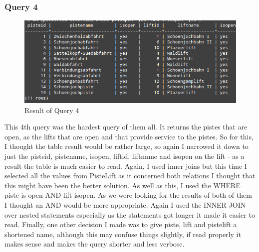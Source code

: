\documentclass[12pt]{article}
\begin{document}
\subsubsection{Query 4}
\begin{figure}[htp]
\centering
\includegraphics[scale=0.55]{Screenshots/query4upd.png}
\caption{Result of Query 4}
\label{}
\end{figure}
This 4th query was the hardest query of them all. It returns the pistes that are open, as the lifts that are open and that provide service to the pistes. So for this, I thought the table result would be rather large, so again I narrowed it down to just the pisteid, pistename, isopen, liftid, liftname and isopen on the lift - as a result the table is much easier to read. Again, I used inner joins but this time I selected all the values from PisteLift as it concerned both relations I thought that this might have been the better solution. As well as this, I used the WHERE piste is open AND lift isopen. As we were looking for the results of both of them I thought an AND would be more appropriate. Again I used the INNER JOIN over nested statements especially as the statements got longer it made it easier to read. Finally, one other decision I made was to give piste, lift and pistelift a shortened name, although this may confuse things slightly, if read properly it makes sense and makes the query shorter and less verbose.
\end{document}
